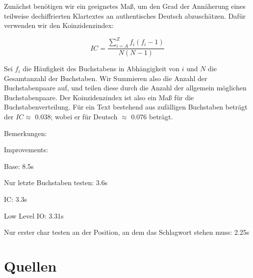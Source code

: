 \documentclass[ngerman, a4paper, footsepline, headsepline]{scrreport}
\begin{document}
	Zunächst benötigen wir ein geeignetes Maß, um den Grad der Annäherung eines teilweise dechiffrierten Klartextes an authentisches Deutsch abzuschätzen. Dafür verwenden wir den Koinzidenzindex:
	
	$$
	IC = \frac{\sum_{i=A}^{Z}f_i(f_i-1)}{N(N-1)}
	$$
	
	Sei $f_i$ die Häufigkeit des Buchstabens in Abhängigkeit von $i$ und $N$ die Gesamtanzahl der Buchstaben. Wir Summieren also die Anzahl der Buchstabenpaare auf, und teilen diese durch die Anzahl der allgemein möglichen Buchstabenpaare. Der Koinzidenzindex ist also ein Maß für die Buchstabenverteilung. Für ein Text bestehend aus zufälligen Buchstaben beträgt der $IC \approx$ 0.038; wobei er für Deutsch $\approx$ 0.076 beträgt.
	\newpage
	
	Bemerkungen:
	
	Improvements:
	
	Base: 8.5s
	
	Nur letzte Buchstaben testen: 3.6s
	
	IC: 3.3s
	
	Low Level IO: 3.31s
	
	Nur erster char testen an der Position, an dem das Schlagwort stehen muss: 2.25s 
	
	
	\chapter{Quellen}
	
	
	
	
	
	
\end{document}
